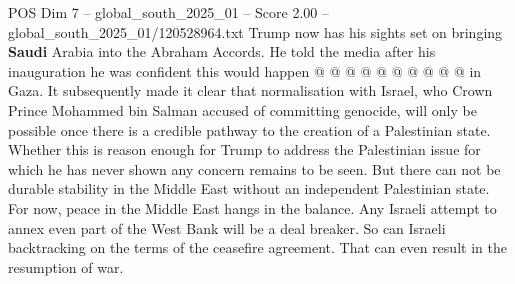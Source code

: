 \begin{textsample}{POS Dim 7 – global\_south\_2025\_01 – Score 2.00 – global\_south\_2025\_01/120528964.txt}
Trump now has his sights set on bringing \textbf{Saudi} Arabia into the Abraham Accords.
He told the media after his inauguration he was confident this would happen @ @ @ @ @ @ @ @ @ @ in Gaza.
It subsequently made it clear that normalisation with Israel, who Crown Prince Mohammed bin Salman accused of committing genocide, will only be possible once there is a credible pathway to the creation of a Palestinian state.
Whether this is reason enough for Trump to address the Palestinian issue for which he has never shown any concern remains to be seen.
But there can not be durable stability in the Middle East without an independent Palestinian state.
For now, peace in the Middle East hangs in the balance.
Any Israeli attempt to annex even part of the West Bank will be a deal breaker.
So can Israeli backtracking on the terms of the ceasefire agreement.
That can even result in the resumption of war.

\end{textsample}
